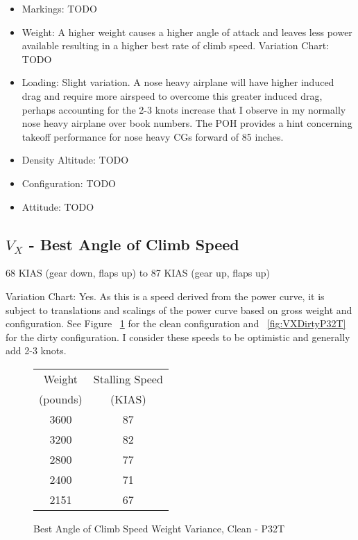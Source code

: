 \begin{itemize}
\item Markings: TODO
\item Weight: A higher weight causes a higher angle of attack and leaves less power available resulting in a higher best rate of climb speed.
Variation Chart: TODO
\item Loading: Slight variation. A nose heavy airplane will have higher induced drag and require more airspeed to overcome this greater induced drag, perhaps accounting for the 2-3 knots increase that I observe in my normally nose heavy airplane over book numbers. The POH provides a hint concerning takeoff performance for nose heavy CGs forward of 85 inches.
\item Density Altitude: TODO
\item Configuration: TODO
\item Attitude: TODO
\end{itemize}

\subsection{$V_X$ - Best Angle of Climb Speed}

68 KIAS (gear down, flaps up) to 87 KIAS (gear up, flaps up)

Variation Chart: Yes. As this is a speed derived from the power curve, it is subject to translations and scalings of the power curve based on gross weight and configuration. See Figure ~\ref{fig:VXCleanP32T} for the clean configuration and ~\ref{fig:VXDirtyP32T} for the dirty configuration. I consider these speeds to be optimistic and generally add 2-3 knots.

\begin{figure}
\begin{center}
\begin{tabular}{ |c|c| }
    \hline
    Weight & Stalling Speed \\
    (pounds) & (KIAS) \\
    \hline
     3600 &  87 \\
     3200 &  82 \\
    \hline
     2800 &  77 \\
     2400 &  71 \\
    \hline
     2151 &  67 \\
    \hline
\end{tabular}
\end{center}
\caption{Best Angle of Climb Speed Weight Variance, Clean - P32T}
\label{fig:VXCleanP32T}
\end{figure}


